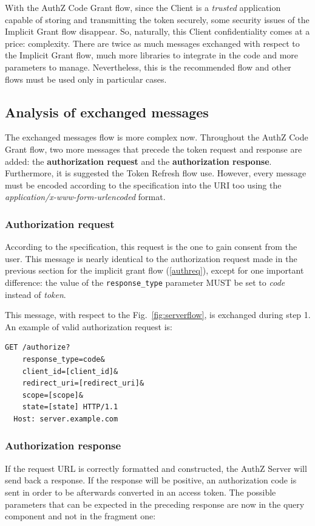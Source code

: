 With the AuthZ Code Grant flow, since the Client is a \textit{trusted} application capable of storing and transmitting the token securely, some security issues of the Implicit Grant flow disappear. So, naturally, this Client confidentiality comes at a price: complexity. There are twice as much messages exchanged with respect to the Implicit Grant flow, much more libraries to integrate in the code and more parameters to manage. Nevertheless, this is the recommended flow and other flows must be used only in particular cases.


\subsection{Analysis of exchanged messages}
The exchanged messages flow is more complex now. Throughout the AuthZ Code Grant flow, two more messages that precede the token request and response are added: the \textbf{authorization request} and the \textbf{authorization response}. Furthermore, it is suggested the Token Refresh flow use. However, every message must be encoded according to the specification into the URI too using the \textit{application/x-www-form-urlencoded} format.

\subsubsection{Authorization request}
According to the specification, this request is the one to gain consent from the user. This message is nearly identical to the authorization request made in the previous section for the implicit grant flow (\ref{authreq}), except for one important difference: the value of the \texttt{response\_type} parameter MUST be set to \textit{code} instead of \textit{token}.

\noindent This message, with respect to the Fig.~\ref{fig:serverflow}, is exchanged during step 1. An example of valid authorization request is:

\begin{lstlisting}[basicstyle=\ttfamily]
  GET /authorize?
    response_type=code&
    client_id=[client_id]&
    redirect_uri=[redirect_uri]&
    scope=[scope]&
    state=[state] HTTP/1.1
  Host: server.example.com
\end{lstlisting}

\subsubsection{Authorization response}
If the request URL is correctly formatted and constructed, the AuthZ Server will send back a response. If the response will be positive, an authorization code is sent in order to be afterwards converted in an access token.
The possible parameters that can be expected in the preceding response are now in the query component and not in the fragment one:


